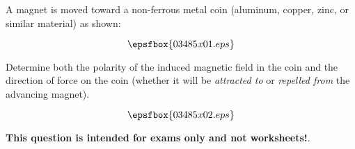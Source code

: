

A magnet is moved toward a non-ferrous metal coin (aluminum, copper, zinc, or similar material) as shown:

$$\epsfbox{03485x01.eps}$$

Determine both the polarity of the induced magnetic field in the coin and the direction of force on the coin (whether it will be {\it attracted to} or {\it repelled from} the advancing magnet).







$$\epsfbox{03485x02.eps}$$







{\bf This question is intended for exams only and not worksheets!}.



